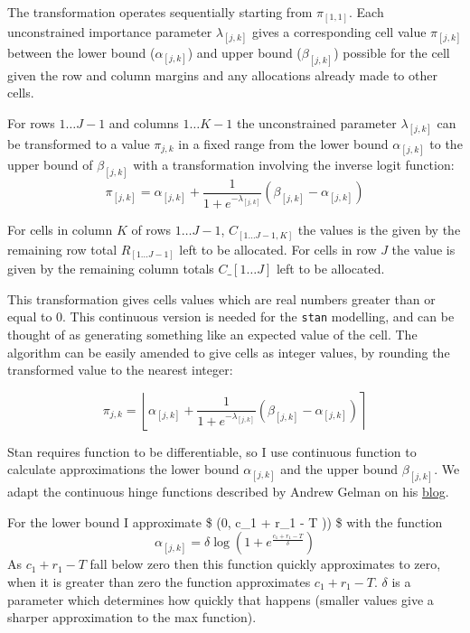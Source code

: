 \documentclass[
  letterpaper,
  DIV=11,
  numbers=noendperiod]{scrartcl}
\begin{document}
The transformation operates sequentially starting from \(\pi_{[1,1]}\).
Each unconstrained importance parameter \(\lambda_{[j,k]}\) gives a
corresponding cell value \(\pi_{[j,k]}\) between the lower bound
(\(\alpha_{[j,k]}\)) and upper bound (\(\beta_{[j,k]}\)) possible for
the cell given the row and column margins and any allocations already
made to other cells.

For rows \(1 \dots J-1\) and columns \(1 \dots K-1\) the unconstrained
parameter \(\lambda_{[j,k]}\) can be transformed to a value
\(\pi_{j,k}\) in a fixed range from the lower bound \(\alpha_{[j,k]}\)
to the upper bound of \(\beta_{[j,k]}\) with a transformation involving
the inverse logit function:
\[\pi_{[j,k]} = \alpha_{[j,k]} + \frac{1}{1+e^{-\lambda_{[j,k]}}}(\beta_{[j,k]} - \alpha_{[j,k]})\]

For cells in column \(K\) of rows \(1 \dots J-1\),
\(C_{[1 \dots J-1, K]}\) the values is the given by the remaining row
total \(R_{[1 \dots J-1]}\) left to be allocated. For cells in row \(J\)
the value is given by the remaining column totals
\(C\_{\left[1 \dots J \right]}\) left to be allocated.

This transformation gives cells values which are real numbers greater
than or equal to 0. This continuous version is needed for the
\texttt{stan} modelling, and can be thought of as generating something
like an expected value of the cell. The algorithm can be easily amended
to give cells as integer values, by rounding the transformed value to
the nearest integer:

\[\pi_{j,k} = \left\lfloor \alpha_{[j,k]} + \frac{1}{1+e^{-\lambda_{[j,k]}}}(\beta_{[j,k]} - \alpha_{[j,k]}) \right\rceil\]

Stan requires function to be differentiable, so I use continuous
function to calculate approximations the lower bound \(\alpha_{[j,k]}\)
and the upper bound \(\beta_{[j,k]}\). We adapt the continuous hinge
functions described by Andrew Gelman on his
\href{https://statmodeling.stat.columbia.edu/2017/05/19/continuous-hinge-function-bayesian-modeling/}{blog}.

For the lower bound I approximate \$ \left(0, c\_1 + r\_1 -
T )\right) \$ with the function
\[\alpha_[j,k] = \delta \log \left(1 +  e^{\frac{c_1 + r_1 - T}{\delta}} \right)\]
As \(c_1 + r_1 - T\) fall below zero then this function quickly
approximates to zero, when it is greater than zero the function
approximates \(c_1 + r_1 - T\). \(\delta\) is a parameter which
determines how quickly that happens (smaller values give a sharper
approximation to the max function).
\end{document}

